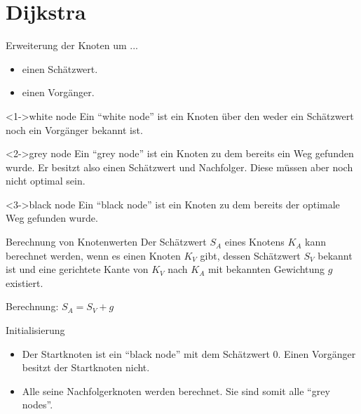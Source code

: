 \section{Dijkstra}

\begin{frame}
	\begin{block}{Erweiterung der Knoten um ...}
		\begin{itemize}
			\item<2-> einen Schätzwert.
			\item<3-> einen Vorgänger.
		\end{itemize}
	\end{block}
\end{frame}

\begin{frame}
	\begin{block}<1->{white node}
		Ein ``white node'' ist ein Knoten über den weder ein Schätzwert noch ein Vorgänger bekannt ist.
	\end{block}
	\begin{block}<2->{grey node}
		Ein ``grey node'' ist ein Knoten zu dem bereits ein Weg gefunden wurde. Er besitzt also einen Schätzwert und Nachfolger. Diese müssen aber noch nicht optimal sein.
	\end{block}
	\begin{block}<3->{black node}
		Ein ``black node'' ist ein Knoten zu dem bereits der optimale Weg gefunden wurde.
	\end{block}
\end{frame}

\begin{frame}
	\begin{block}{Berechnung von Knotenwerten}
		Der Schätzwert $S_A$ eines Knotens $K_A$ kann berechnet werden, wenn es einen Knoten $K_V$ gibt, dessen Schätzwert $S_V$ bekannt ist und eine gerichtete Kante von $K_V$ nach $K_A$ mit bekannten Gewichtung $g$ existiert.
	\end{block}
	\vfill
	Berechnung: $S_A = S_V + g$
\end{frame}

\begin{frame}
	\begin{block}{Initialisierung}
		\begin{itemize}
			\item<2-> Der Startknoten ist ein ``black node'' mit dem Schätzwert 0. Einen Vorgänger besitzt der Startknoten nicht.
			\item<3-> Alle seine Nachfolgerknoten werden berechnet. Sie sind somit alle ``grey nodes''.
		\end{itemize}
	\end{block}
\end{frame}

